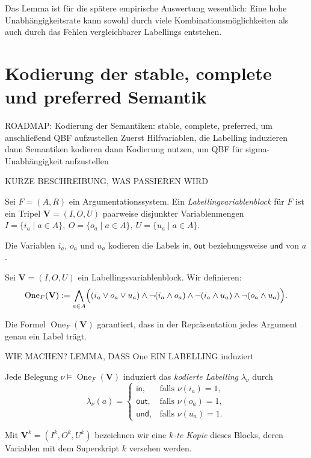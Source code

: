 Das Lemma ist für die spätere empirische Auswertung wesentlich: Eine hohe
Unabhängigkeitsrate kann sowohl durch viele Kombinationsmöglichkeiten als auch durch
das Fehlen vergleichbarer Labellings entstehen.

\section{Kodierung der stable, complete und preferred Semantik}
\label{sec:semantics-encoding}

ROADMAP:
Kodierung der Semantiken: stable, complete, preferred, um anschließend QBF aufzustellen
Zuerst Hilfvariablen, die Labelling induzieren
dann Semantiken kodieren
dann Kodierung nutzen, um QBF für sigma-Unabhängigkeit aufzustellen

KURZE BESCHREIBUNG, WAS PASSIEREN WIRD

\begin{Definition}
    \label{def:labelling-variable-block}
    Sei \(F=(A,R)\) ein Argumentationssystem. Ein
    \emph{Labellingvariablenblock} für \(F\) ist ein Tripel
    \(\mathbf{V}=(I,O,U)\) paarweise disjunkter Variablenmengen
\(
        I=\{i_a\mid a\in A\},~
        O=\{o_a\mid a\in A\},~
        U=\{u_a\mid a\in A\}.
\)
\end{Definition}
Die Variablen \(i_a\), \(o_a\) und \(u_a\) kodieren die Labels
\(\mathsf{in}\), \(\mathsf{out}\) beziehungsweise \(\mathsf{und}\)
von \(a\). 

\begin{Definition}
    Sei \(\mathbf V =(I,O,U)\) ein Labellingsvariablenblock. Wir definieren:
    \[
    \operatorname{One}_F(\mathbf V)
    :=
    \bigwedge_{a\in A}
    \Bigl(
        (i_a\lor o_a\lor u_a)
        \land\neg(i_a\land o_a)
        \land\neg(i_a\land u_a)
        \land\neg(o_a\land u_a)
    \Bigr).
\]
\end{Definition}
Die Formel \(\operatorname{One}_F(\mathbf V)\)
garantiert, dass in der Repräsentation jedes Argument genau ein Label trägt. 


WIE MACHEN? LEMMA, DASS One EIN LABELLING induziert
\begin{Definition}
    Jede Belegung \(\nu\models\operatorname{One}_F(\mathbf V)\)
    induziert das \emph{kodierte Labelling} \(\lambda_\nu\) durch
    \[
        \lambda_\nu(a)=
        \begin{cases}
            \mathsf{in},  &\text{falls }\nu(i_a)=1,\\
            \mathsf{out}, &\text{falls }\nu(o_a)=1,\\
            \mathsf{und}, &\text{falls }\nu(u_a)=1.
        \end{cases}
    \]
\end{Definition}
Mit \(\mathbf V^k=(I^k,O^k,U^k)\) bezeichnen wir eine
\emph{\(k\)-te Kopie} dieses Blocks, deren Variablen mit dem
Superskript \(k\) versehen werden. 

